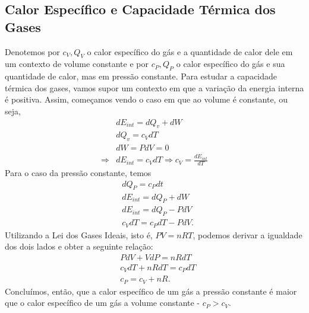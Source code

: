 \documentclass[phsyicsII_notes.tex]{subfiles}
\begin{document}
\subsection{Calor Específico e Capacidade Térmica dos Gases}
Denotemos por \(c_{V}, Q_{V}\) o calor específico do gás e a quantidade de calor dele em um contexto de volume constante e por \(c_{P}, Q_{P}\) o
calor específico do gás e sua quantidade de calor, mas em pressão constante. Para estudar a capacidade térmica dos gases, vamos
supor um contexto em que a variação da energia interna é positiva. Assim, começamos vendo o caso em que ao volume é constante, ou seja,
\begin{align*}
	            & dE_{int} = dQ_{v} + dW                                     \\
	            & dQ_{v} = c_{V}dT                                           \\
	            & dW = PdV = 0                                               \\
	\Rightarrow & dE_{int} = c_{V}dT \Rightarrow c_{V} = \frac{dE_{int}}{dT}
\end{align*}
Para o caso da pressão constante, temos
\begin{align*}
	 & dQ_{P} = c_{P}dt         \\
	 & dE_{int} = dQ_{P} + dW   \\
	 & dE_{int} = dQ_{P} - PdV  \\
	 & c_{V}dT = c_{P}dT - PdV.
\end{align*}
Utilizando a Lei dos Gases Ideais, isto é, \(PV = nRT\), podemos derivar a igualdade dos dois lados e obter a seguinte relação:
\begin{align*}
	 & PdV + VdP = nRdT         \\
	 & c_{V}dT + nRdT = c_{P}dT \\
	 & c_{P} = c_{V} + nR.
\end{align*}
Concluímos, então, que a calor específico de um gás a pressão constante é maior que o calor específico de um gás a
volume constante - \(c_{P} > c_{V}\).
\end{document}
